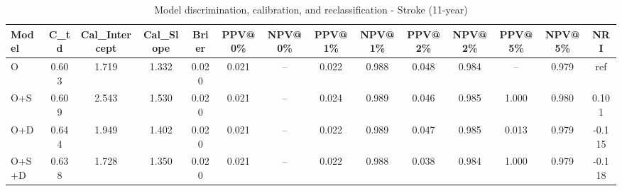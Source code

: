 \begin{table}[htbp]
\centering
\small
\caption{Model discrimination, calibration, and reclassification - Stroke (11-year)}
\label{tab:perf_stroke_11y}
\begin{tabular}{lccccccccccccc}
\toprule
Model & C\_td & Cal\_Intercept & Cal\_Slope & Brier & PPV@0\% & NPV@0\% & PPV@1\% & NPV@1\% & PPV@2\% & NPV@2\% & PPV@5\% & NPV@5\% & NRI \\
\midrule
O & 0.603 & 1.719 & 1.332 & 0.020 & 0.021 & -- & 0.022 & 0.988 & 0.048 & 0.984 & -- & 0.979 & ref \\
O+S & 0.609 & 2.543 & 1.530 & 0.020 & 0.021 & -- & 0.024 & 0.989 & 0.046 & 0.985 & 1.000 & 0.980 & 0.101 \\
O+D & 0.644 & 1.949 & 1.402 & 0.020 & 0.021 & -- & 0.022 & 0.989 & 0.047 & 0.985 & 0.013 & 0.979 & -0.115 \\
O+S+D & 0.638 & 1.728 & 1.350 & 0.020 & 0.021 & -- & 0.022 & 0.988 & 0.038 & 0.984 & 1.000 & 0.979 & -0.118 \\
\bottomrule
\end{tabular}
\end{table}